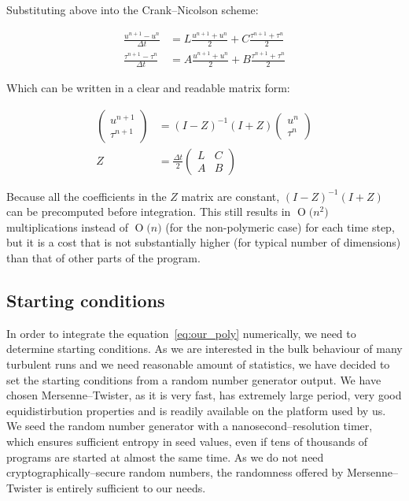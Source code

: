 \documentclass[11pt,a4paper]{article}
\newcommand{\BigO}[1]{\ensuremath{\operatorname{O}\bigl(#1\bigr)}}
\begin{document}
Substituting above into the Crank--Nicolson scheme:

\begin{equation}\label{eq:cn_ops}
    \begin{aligned}
        \frac{u^{n+1} - u^n}{\Delta t} &= L\frac{u^{n+1} + u^n}{2} + C\frac{\tau^{n+1} + \tau^n}{2} \\
        \frac{\tau^{n+1} - \tau^n}{\Delta t} &= A\frac{u^{n+1} + u^n}{2} + B\frac{\tau^{n+1} + \tau^n}{2}
    \end{aligned}
\end{equation}

Which can be written in a clear and readable matrix form:

\begin{equation}\label{eq:cn_simpl}
    \begin{aligned}
        \begin{pmatrix}
            u^{n+1} \\
            \tau^{n+1}
        \end{pmatrix} &= (I - Z)^{-1} (I + Z) \begin{pmatrix} u^n \\ \tau^n \end{pmatrix} \\
            Z &= \frac{\Delta t}{2}\begin{pmatrix}
            L & C \\
            A & B
        \end{pmatrix}
    \end{aligned}
\end{equation}

Because all the coefficients in the $Z$ matrix are constant, $(I - Z)^{-1}(I + Z)$ can be precomputed before integration.
This still results in \BigO{n^2} multiplications instead of \BigO{n} (for the non-polymeric case) for each time step, but it is a cost that is not substantially higher (for typical number of dimensions) than that of other parts of the program.

\subsection{Starting conditions}
In order to integrate the equation~\eqref{eq:our_poly} numerically, we need to determine starting conditions.
As we are interested in the bulk behaviour of many turbulent runs and we need reasonable amount of statistics, we have decided to set the starting conditions from a random number generator output.
We have chosen Mersenne--Twister\cite{Matsumoto98}, as it is very fast, has extremely large period, very good equidistirbution properties and is readily available on the platform used by us.
We seed the random number generator with a nanosecond--resolution timer, which ensures sufficient entropy in seed values, even if tens of thousands of programs are started at almost the same time.
As we do not need cryptographically--secure random numbers, the randomness offered by Mersenne--Twister is entirely sufficient to our needs.
\end{document}
